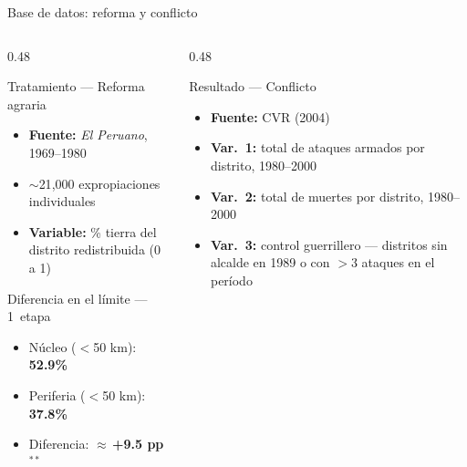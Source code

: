 \documentclass[aspectratio=169,t]{beamer}
\newcommand{\hl}[1]{\textcolor{azulmedio}{\textbf{#1}}}
\begin{document}
\begin{frame}{Base de datos: reforma y conflicto}
\begin{columns}[T]
  \begin{column}{0.48\textwidth}
    \begin{block}{Tratamiento --- Reforma agraria}
    \small\begin{itemize}
      \item \textbf{Fuente:} \textit{El Peruano}, 1969--1980
      \item $\sim$21{,}000 expropiaciones individuales
      \item \textbf{Variable:} \% tierra del distrito
            redistribuida (0 a 1)
    \end{itemize}
    \end{block}
    \vspace{0.15cm}
    \begin{exampleblock}{\small
        Diferencia en el l\'imite ---
        1\textordfeminine\ etapa}
    \small\begin{itemize}
      \item N\'ucleo ($<$50 km): \hl{52.9\%}
      \item Periferia ($<$50 km): \hl{37.8\%}
      \item Diferencia:
            \hl{$\approx$\,+9.5 pp$^{**}$}
    \end{itemize}
    \end{exampleblock}
  \end{column}
  \begin{column}{0.48\textwidth}
    \begin{block}{Resultado --- Conflicto}
    \small\begin{itemize}
      \item \textbf{Fuente:} CVR (2004)
      \item \textbf{Var.\ 1:} total de ataques armados
            por distrito, 1980--2000
      \item \textbf{Var.\ 2:} total de muertes por
            distrito, 1980--2000
      \item \textbf{Var.\ 3:} control guerrillero ---
            distritos sin alcalde en 1989 o con
            $>$3 ataques en el per\'iodo
    \end{itemize}
    \end{block}
  \end{column}
\end{columns}
\end{frame}
\end{document}
